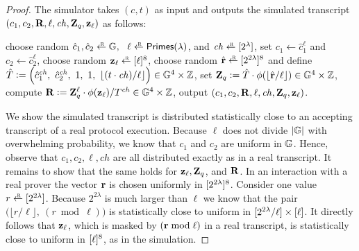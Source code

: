 \documentclass[11pt]{article}
\begin{document}
\begin{proof}
The simulator takes $(c, t)$ as input and outputs the simulated transcript
$(c_1, c_2, \mathbf{R}, \ell, \mathit{ch}, \mathbf{Z}_q, \mathbf{z}_\ell)$ as follows:
\begin{alg}
\> choose random $\hat{c}_1, \hat{c}_2 \rgets \GG,\ \ \ell \rgets \primes$, and
$\mathit{ch} \rgets \range{2^\lambda}$, \AlgSep
\> set $c_1 \gets \hat{c}_1^\ell$ and $c_2 \gets \hat{c}_2^\ell$, \AlgSep
\> choose random $\zv_\ell \rgets \range{\ell}^8$, \AlgSep
\lnum \label{ln:randv}
\> choose random $\hat{\rv} \rgets \range{2^{2\lambda}}^8$
and define $\hat{T} \deq \Big(\hat{c}_1^\mathit{ch},\ \hat{c}_2^\mathit{ch},\ 1,\ 1,\ \lfloor (t \cdot \mathit{ch})/\ell \rfloor\Big) \in \GG^4 \times \ZZ$, \AlgSep
\> set $\mathbf{Z}_q \mathrel{\mathop:}= \hat{T} \cdot \phi(\lfloor \hat{\mathbf{r}}/\ell \rfloor) \in \mathbb G^4 \times \mathbb Z$, \AlgSep
\lnum \label{ln:computeR}
\> compute $\mathbf{R} \mathrel{\mathop:}= \mathbf{Z}_q^\ell \cdot \phi(\mathbf{z}_\ell) / T^\mathit{ch} \in \mathbb G^4 \times \mathbb Z$, \AlgSep
\> output $(c_1, c_2, \mathbf{R}, \ell, \mathit{ch}, \mathbf{Z}_q, \mathbf{z}_\ell)$.
\end{alg}
We show the simulated transcript is distributed statistically close
to an accepting transcript of a real protocol execution.
Because $\ell$ does not divide $\lvert \mathbb G \rvert$ with overwhelming probability,
we know that $c_1$ and $c_2$ are uniform in $\mathbb G$. 
Hence, observe that $c_1, c_2, \ell, \mathit{ch}$ are all distributed 
exactly as in a real transcript.  It remains to show that the same holds
for $\mathbf{z}_\ell, \mathbf{Z}_q$, and $\mathbf{R}$. 
In an interaction with a real prover 
the vector $\mathbf{r}$ is chosen uniformly in $[{2^{2\lambda}}]^8$.
Consider one value $r \rgets \range{2^{2\lambda}}$.
Because $2^{2\lambda}$ is much larger than $\ell$
we know that the pair 
$\big(\lfloor r/\ell \rfloor,\ (r \bmod \ell) \big)$
is statistically close to uniform in $[{2^{2\lambda}/\ell}] \times [{\ell}]$.
It directly follows that $\mathbf{z}_\ell$, which is masked by $(\mathbf{r} \bmod \ell)$
in a real transcript, is statistically close to uniform 
in $[{\ell}]^8$, as in the simulation.


\end{proof}
\end{document}
